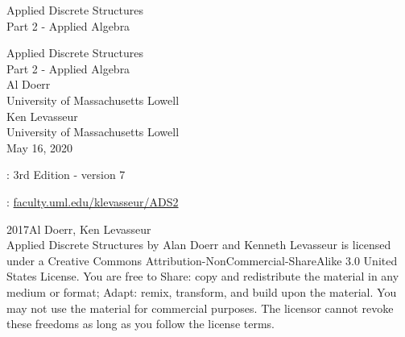 \documentclass[twoside,10pt,]{book}
\newcommand{\titlepagefont}{\relax}
\numberwithin{equation}{section}
\begin{document}
\frontmatter
\thispagestyle{empty}
{\titlepagefont\centering
\vspace*{0.28\textheight}
{\Huge Applied Discrete Structures}\\[2\baselineskip]
{\LARGE Part 2 - Applied Algebra}\\
}
\clearpage
\thispagestyle{empty}
\null%
\clearpage
\thispagestyle{empty}
{\titlepagefont\centering
\vspace*{0.14\textheight}
{\Huge Applied Discrete Structures}\\[\baselineskip]
{\LARGE Part 2 - Applied Algebra}\\[3\baselineskip]
{\Large Al Doerr}\\[0.5\baselineskip]
{\Large University of Massachusetts Lowell}\\[3\baselineskip]
{\Large Ken Levasseur}\\[0.5\baselineskip]
{\Large University of Massachusetts Lowell}\\[3\baselineskip]
{\Large May 16, 2020}\\}
\clearpage
\thispagestyle{empty}
\label{g:colophon:idm404602205040}{}\hypertarget{g:colophon:idm404602205040}{}
: 3rd Edition - version 7\par\medskip
{}: \href{http:\slash{}\slash{}faculty.uml.edu\slash{}klevasseur\slash{}ADS2}{faculty.uml.edu\slash{}klevasseur\slash{}ADS2}\par\medskip
\noindent\textcopyright{}2017\quad{}Al Doerr, Ken Levasseur\\[0.5\baselineskip]
Applied Discrete Structures by Alan Doerr and Kenneth Levasseur is licensed under a Creative Commons Attribution-NonCommercial-ShareAlike 3.0 United States License. You are free to Share: copy and redistribute the material in any medium or format; Adapt: remix, transform, and build upon the material. You may not use the material for commercial purposes.  The licensor cannot revoke these freedoms as long as you follow the license terms.\par\medskip
{}
\null\clearpage
\end{document}
